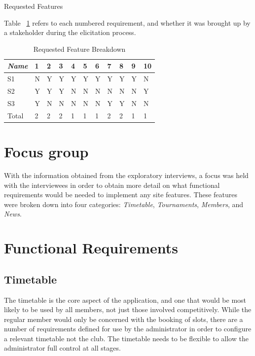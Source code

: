 \begin{table}[H]
\label{fig:requirementsFeatures}
\caption{Requested Features}
\end{table}
Table ~\ref{fig:reqbreakdown} refers to each numbered requirement, and whether it was brought up by a stakeholder during the elicitation process.
\begin{table}[H]
\caption{Requested Feature Breakdown}
\begin{center}
    \begin{tabular}{ | l | l | l | l| l| l| l| l| l|l| p{.22cm} |}
    \hline
     \textit{Name}& 1& 2 & 3 & 4 & 5 & 6 & 7 & 8 & 9 & 10\\ \hline
	 S1 & N & Y & Y & Y & Y & Y & Y & Y & Y & N\\ \hline
	 S2 & Y & Y & Y & N & N & N & N & N & N & Y\\ \hline
	 S3 & Y & N & N & N & N & N & Y & Y & N & N\\ \hline
  Total & 2 & 2 & 2 & 1 & 1 & 1 & 2 & 2 & 1 & 1\\ \hline
    \end{tabular}
\end{center}
\label{fig:reqbreakdown}
\end{table}

\section{Focus group}

With the information obtained from the exploratory interviews, a focus was held with the interviewees in order to obtain more detail on what functional requirements would be needed to implement any site features. These features were broken down into four categories: \textit{Timetable}, \textit{Tournaments}, \textit{Members}, and \textit{News}.

\section{Functional Requirements}

\subsection{Timetable} 

The timetable is the core aspect of the application, and one that would be most likely to be used by all members, not just those involved competitively. While the regular member would only be concerned with the booking of slots, there are a number of requirements defined for use by the administrator in order to configure a relevant timetable not the club. The timetable needs to be flexible to allow the administrator full control at all stages.

